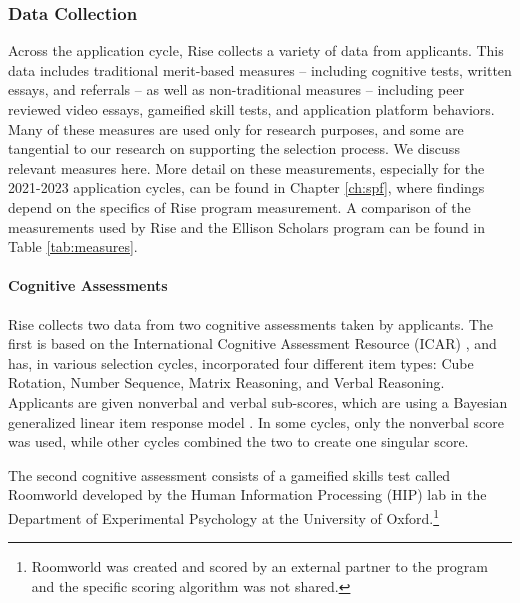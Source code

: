 \subsubsection{Data Collection}
Across the application cycle, Rise collects a variety of data from applicants. This data includes traditional merit-based measures – including cognitive tests, written essays, and referrals – as well as non-traditional measures – including peer reviewed video essays, gameified skill tests, and application platform behaviors. Many of these measures are used only for research purposes, and some are tangential to our research on supporting the selection process. We discuss relevant measures here. More detail on these measurements, especially for the 2021-2023 application cycles, can be found in Chapter \ref{ch:spf}, where findings depend on the specifics of Rise program measurement. A comparison of the measurements used by Rise and the Ellison Scholars program can be found in Table \ref{tab:measures}.

\paragraph{Cognitive Assessments}
Rise collects two data from two cognitive assessments taken by applicants. The first is based on the International Cognitive Assessment Resource (ICAR) \cite{condon2014international, subotic2020psychometric}, and has, in various selection cycles, incorporated four different item types: Cube Rotation, Number Sequence, Matrix Reasoning, and Verbal Reasoning. Applicants are given nonverbal and verbal sub-scores, which are using a Bayesian generalized linear item response model \cite{burkner2021bayesian}. In some cycles, only the nonverbal score was used, while other cycles combined the two to create one singular score.

The second cognitive assessment consists of a gameified skills test called Roomworld developed by the Human Information Processing (HIP) lab in the Department of Experimental Psychology at the University of Oxford.\footnote{Roomworld was created and scored by an external partner to the program and the specific scoring algorithm was not shared.}

